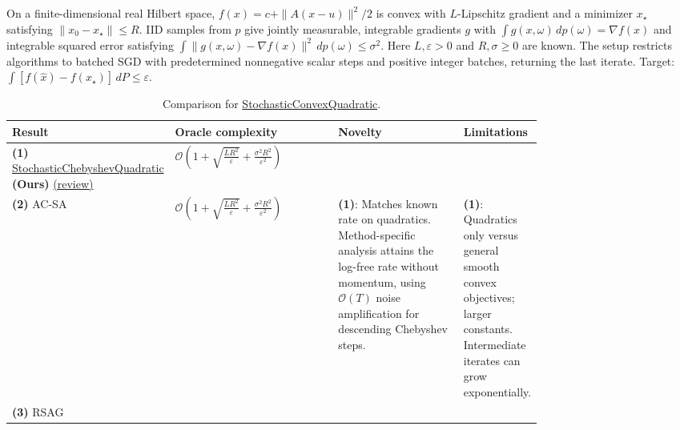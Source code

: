 \begin{table}[tp]
\centering
\caption{Comparison for \href{https://github.com/k3nfalt/longtails/blob/main/LongTails/Setups/StochasticConvexQuadratic.lean}{StochasticConvexQuadratic}.}\label{tab:StochasticConvexQuadratic}
\parbox{\linewidth}{\footnotesize On a finite-dimensional real Hilbert space, $f(x)=c+\|A(x-u)\|^2/2$ is convex with $L$-Lipschitz gradient and a minimizer $x_\star$ satisfying $\|x_0-x_\star\|\le R$. IID samples from $p$ give jointly measurable, integrable gradients $g$ with $\int g(x,\omega)\,dp(\omega)=\nabla f(x)$ and integrable squared error satisfying $\int\|g(x,\omega)-\nabla f(x)\|^2\,dp(\omega)\le\sigma^2$. Here $L,\varepsilon>0$ and $R,\sigma\ge0$ are known. The setup restricts algorithms to batched SGD with predetermined nonnegative scalar steps and positive integer batches, returning the last iterate. Target: $\int[f(\widehat x)-f(x_\star)]\,dP\le\varepsilon$.}\par\smallskip
\begin{threeparttable}
\footnotesize
\setlength{\tabcolsep}{4pt}\renewcommand{\arraystretch}{1.25}
\begin{tabularx}{\linewidth}{@{}>{\raggedright\arraybackslash}p{0.20\linewidth}>{\raggedright\arraybackslash}p{0.32\linewidth}>{\raggedright\arraybackslash}p{0.25\linewidth}>{\raggedright\arraybackslash}X@{}}
\toprule
\textbf{Result} & \textbf{Oracle complexity} & \textbf{Novelty} & \textbf{Limitations} \\
\midrule
\textbf{(1)} \href{https://github.com/k3nfalt/longtails/blob/main/LongTails/Theorems/StochasticChebyshevQuadratic.lean}{Stochastic\allowbreak Chebyshev\allowbreak Quadratic} \textbf{(Ours)} \href{https://github.com/k3nfalt/longtails/blob/main/scripts/reviews/StochasticChebyshevQuadratic.md}{(review)}
& $\mathcal{O}\!\left(1+\sqrt{\frac{LR^2}{\varepsilon}}+\frac{\sigma^2R^2}{\varepsilon^2}\right)$ & & \\
\midrule[1.2pt]
\textbf{(2)} AC-SA \citep[Proposition~7]{scqGhadimiLan2012}
& $\mathcal{O}\!\left(1+\sqrt{\frac{LR^2}{\varepsilon}}+\frac{\sigma^2R^2}{\varepsilon^2}\right)$
& \textbf{(1)}: Matches known rate on quadratics. Method-specific analysis attains the log-free rate without momentum, using $\mathcal{O}(T)$ noise amplification for descending Chebyshev steps.
& \textbf{(1)}: Quadratics only versus general smooth convex objectives; larger constants. Intermediate iterates can grow exponentially. \\
\midrule
\textbf{(3)} RSAG \citep[Corollary~3(b), (3.22)]{scqGhadimiLan2016}

\end{tabularx}
\end{threeparttable}
\end{table}
